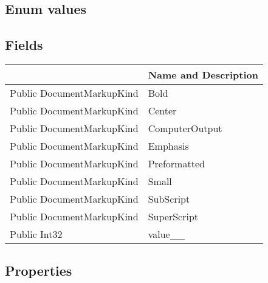 \documentclass[11pt, oneside, a4paper]{book}
\begin{document}
\subsection{Enum values}

\subsection{Fields}
\begin{center}
\begin{tabular}{| p{3cm} | p{12cm} | }
\hline
\textbf{ } & \textbf{ Name and Description}\\
\hline
 Public  DocumentMarkupKind &  Bold\hypertarget{SoftwareEngineeringTools.{}Documentation.{}DocumentMarkupKind.{}Bold}{}\\
\hline
 Public  DocumentMarkupKind &  Center\hypertarget{SoftwareEngineeringTools.{}Documentation.{}DocumentMarkupKind.{}Center}{}\\
\hline
 Public  DocumentMarkupKind &  ComputerOutput\hypertarget{SoftwareEngineeringTools.{}Documentation.{}DocumentMarkupKind.{}ComputerOutput}{}\\
\hline
 Public  DocumentMarkupKind &  Emphasis\hypertarget{SoftwareEngineeringTools.{}Documentation.{}DocumentMarkupKind.{}Emphasis}{}\\
\hline
 Public  DocumentMarkupKind &  Preformatted\hypertarget{SoftwareEngineeringTools.{}Documentation.{}DocumentMarkupKind.{}Preformatted}{}\\
\hline
 Public  DocumentMarkupKind &  Small\hypertarget{SoftwareEngineeringTools.{}Documentation.{}DocumentMarkupKind.{}Small}{}\\
\hline
 Public  DocumentMarkupKind &  SubScript\hypertarget{SoftwareEngineeringTools.{}Documentation.{}DocumentMarkupKind.{}SubScript}{}\\
\hline
 Public  DocumentMarkupKind &  SuperScript\hypertarget{SoftwareEngineeringTools.{}Documentation.{}DocumentMarkupKind.{}SuperScript}{}\\
\hline
 Public  Int32 &  value\_\_\hypertarget{SoftwareEngineeringTools.{}Documentation.{}DocumentMarkupKind.{}value\_\_}{}\\
\hline
\end{tabular}
\end{center}

\subsection{Properties}
\end{document}

